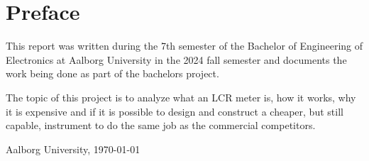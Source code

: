 \thispagestyle{empty}
\chapter*{Preface}\label{ch:preface}

This report was written during the 7th semester of the Bachelor of Engineering of Electronics at Aalborg University in the 2024 fall semester and documents the work being done as part of the bachelors project.

The topic of this project is to analyze what an LCR meter is, how it works, why it is expensive and if it is possible to design and construct a cheaper, but still capable, instrument to do the same job as the commercial competitors. 

\vspace{\baselineskip}\hfill Aalborg University, \today


